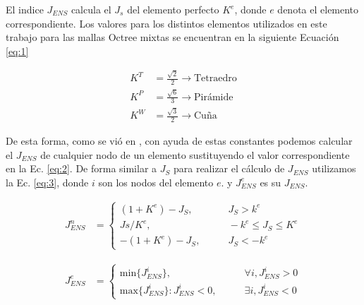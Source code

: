 El indice $J_{ENS}$ calcula el $J_s$ del elemento perfecto $K^e$, donde $e$ denota el elemento correspondiente. Los valores para los distintos elementos utilizados en este trabajo para las mallas Octree mixtas se encuentran en la siguiente Ecuación \ref{eq:1}

\begin{equation} \label{eq:1}
    \begin{aligned}
    K^T &= \frac{\sqrt{2}}{2} \longrightarrow \text{Tetraedro} \\
    K^P &= \frac{\sqrt{6}}{3} \longrightarrow \text{Pirámide} \\
    K^W &= \frac{\sqrt{3}}{2} \longrightarrow \text{Cuña}
    \end{aligned}
\end{equation}

De esta forma, como se vió en \cite{daines2018repairing}, con ayuda de estas constantes podemos calcular el $J_{ENS}$ de cualquier nodo de un elemento sustituyendo el valor correspondiente en la Ec. \ref{eq:2}. De forma similar a $J_S$ para realizar el cálculo de $J_{ENS}$ utilizamos la Ec. \ref{eq:3}, donde $i$ son los nodos del elemento $e$. y $J^e_{ENS}$ es su $J_{ENS}$.

\begin{equation} \label{eq:2}
    \begin{aligned}
J^n_{ENS} &=    
\left\{
\begin{array}{rl}
     ( 1 + K^e ) - J_S, & \qquad J_S > k^e
  \\ Js/K^e, & \qquad -k^e \leq J_S \leq K^e
  \\ -( 1 + K^e ) - J_S, & \qquad J_S < -k^e
\end{array}
\right.
    \end{aligned}
\end{equation}


\begin{equation} \label{eq:3}
    \begin{aligned}
J^e_{ENS} &=    
\left\{
\begin{array}{ll}
     \text{min}\{J^i_{ENS}\}, & \qquad \forall i, J^i_{ENS} > 0
  \\ \text{max}\{J^i_{ENS}\} : J^i_{ENS} < 0, & \qquad \exists i, J^i_{ENS} < 0
\end{array}
\right.
    \end{aligned}
\end{equation}




